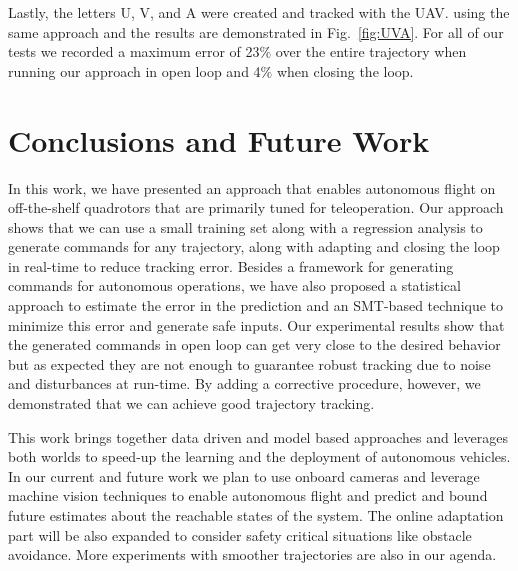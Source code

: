 \documentclass[letterpaper, 10 pt, conference]{ieeeconf}  %
\begin{document}
Lastly, the letters U, V, and A were created and tracked with the UAV. using the same approach and the results are demonstrated in Fig.~\ref{fig:UVA}. For all of our tests we recorded a maximum error of 23$\%$ over the entire trajectory when running our approach in open loop and 4$\%$ when closing the loop. 


\section{Conclusions and Future Work} \label{sec:conc}
In this work, we have presented an approach that enables autonomous flight on off-the-shelf quadrotors that are primarily tuned for teleoperation. Our approach shows that we can use a small training set along with a regression analysis to generate commands for any trajectory, along with adapting and closing the loop in real-time to reduce tracking error. Besides a framework for generating commands for autonomous operations, we have also proposed a statistical approach to estimate the error in the prediction and an SMT-based technique to minimize this error and generate safe inputs. Our experimental results show that the generated commands in open loop can get very close to the desired behavior but as expected they are not enough to guarantee robust tracking due to noise and disturbances at run-time. By adding a corrective procedure, however, we demonstrated that we can achieve good trajectory tracking. 

This work brings together data driven and model based approaches and leverages both worlds to speed-up the learning and the deployment of autonomous vehicles.
In our current and future work we plan to use onboard cameras and leverage machine vision techniques to enable autonomous flight and predict and bound future estimates about the reachable states of the system. The online adaptation part will be also expanded to consider safety critical situations like obstacle avoidance. More experiments with smoother trajectories are also in our agenda.



\end{document}
